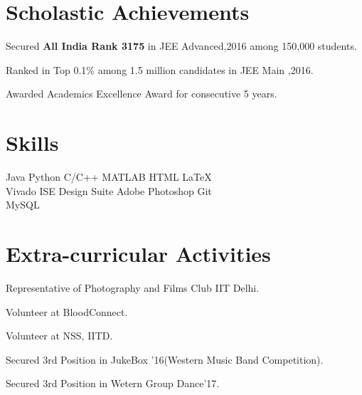 \documentclass[]{deedy-resume-openfont}
\begin{document}
\vspace{\topsep}
\vspace{\topsep}
\section{Scholastic Achievements}
\vspace{\topsep}
\begin{tightemize}
\item Secured \textbf{All India Rank 3175} in JEE Advanced,2016 among 150,000 students.
\item Ranked in Top 0.1\% among 1.5 million candidates in JEE Main ,2016.
\item Awarded Academics Excellence Award for consecutive 5 years. 
\end{tightemize}
\sectionsep


\section{Skills}
\textbullet{} Java \textbullet{}  Python \textbullet{} C/C++ \textbullet{} MATLAB \textbullet{} HTML\textbullet{}  \LaTeX\\ 
\textbullet{}Vivado \textbullet{} ISE Design Suite \textbullet{} Adobe Photoshop \textbullet{} Git \\ 
\textbullet{} MySQL\\
\sectionsep

\section{Extra-curricular Activities}
\vspace{\topsep}
\begin{tightemize}
\item Representative of Photography and Films Club IIT Delhi.
\item Volunteer at BloodConnect.
\item Volunteer at NSS, IITD.
\item Secured 3rd Position in JukeBox '16(Western Music Band Competition).
\item Secured 3rd Position in Wetern Group Dance'17. 
\end{tightemize}
\sectionsep
\end{document}
